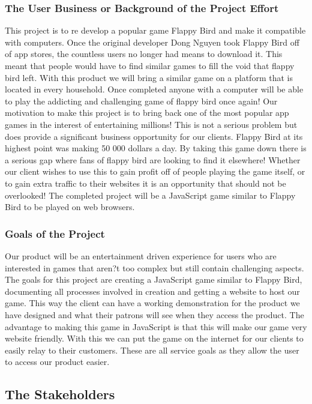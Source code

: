 \documentclass[11pt, oneside]{article}   	%
\begin{document}
\subsubsection*{The User Business or Background of the Project Effort}
This project is to re develop a popular game Flappy Bird and make it compatible with computers. Once the original developer Dong Nguyen took Flappy Bird off of app stores, the countless users no longer had means to download it. This meant that people would have to find similar games to fill the void that flappy bird left. With this product we will bring a similar game on a platform that is located in every household. Once completed anyone with a computer will be able to play the addicting and challenging game of flappy bird once again! Our motivation to make this project is to bring back one of the most popular app games in the interest of entertaining millions! This is not a serious problem but does provide a significant business opportunity for our clients. Flappy Bird at its highest point was making 50 000 dollars a day. By taking this game down there is a serious gap where fans of flappy bird are looking to find it elsewhere! Whether our client wishes to use this to gain profit off of people playing the game itself, or to gain extra traffic to their websites it is an opportunity that should not be overlooked! The completed project will be a JavaScript game similar to Flappy Bird to be played on web browsers. 


\subsubsection*{Goals of the Project}
Our product will be an entertainment driven experience for users who are interested in games that aren?t too complex but still contain challenging aspects. The goals for this project are creating a JavaScript game similar to Flappy Bird, documenting all processes involved in creation and getting a website to host our game. This way the client can have a working demonstration for the product we have designed and what their patrons will see when they access the product. The advantage to making this game in JavaScript is that this will make our game very website friendly. With this we can put the game on the internet for our clients to easily relay to their customers.  These are all service goals as they allow the user to access our product easier.


\subsection*{The Stakeholders}
\end{document}
